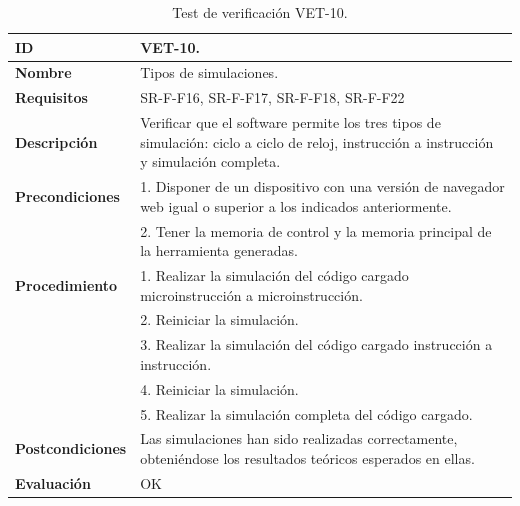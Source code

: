 \begin{center}
\begin{table}[htbp]
\centering
\caption{Test de verificación VET-10.}
\begin{tabular}{@{}p{2.5cm} p{13cm}@{}} 
\toprule
\textbf{ID} 					& VET-10. \\
\midrule
\textbf{Nombre} 				& Tipos de simulaciones. \\
\midrule
\textbf{Requisitos} 		& SR-F-F16, SR-F-F17, SR-F-F18, SR-F-F22\\
\midrule
\textbf{Descripción} 		& Verificar que el \gls{software} permite los tres tipos de simulación: ciclo a ciclo de reloj, instrucción a instrucción y simulación completa. \\
\midrule
\textbf{Precondiciones}		& 1. Disponer de un dispositivo con una versión de navegador web igual o superior a los indicados anteriormente. \\
											& 2. Tener la memoria de control y la memoria principal de la herramienta generadas. \\
\midrule
\textbf{Procedimiento}		& 1. Realizar la simulación del código cargado microinstrucción a microinstrucción.\\
											& 2. Reiniciar la simulación.\\
											& 3. Realizar la simulación del código cargado instrucción a instrucción.\\
											& 4. Reiniciar la simulación.\\
											& 5. Realizar la simulación completa del código cargado. \\
\midrule
\textbf{Postcondiciones} 		&  Las simulaciones han sido realizadas correctamente, obteniéndose los resultados teóricos esperados en ellas.\\
\midrule
\textbf{Evaluación} 			& OK \\
\bottomrule
\end{tabular}
\label{tab:vet10}
\end{table}
\end{center}

